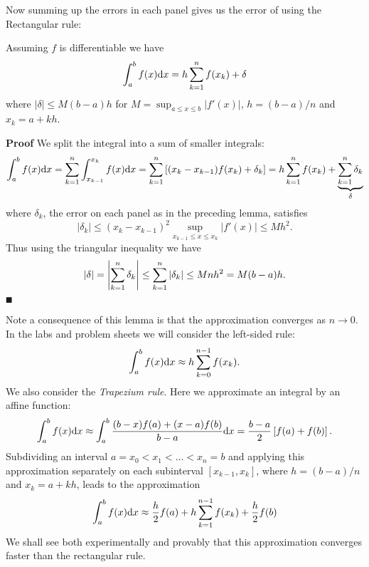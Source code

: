 Now summing up the errors in each panel gives us the error of using the Rectangular rule:

\begin{theorem} Assuming $f$ is differentiable we have
\[
\ensuremath{\int}_a^b f(x) {\rm d}x =  h \ensuremath{\sum}_{k=1}^n f(x_k) +  \ensuremath{\delta}
\]
where $|\ensuremath{\delta}| \ensuremath{\leq} M (b-a) h$ for $M = \sup_{a \ensuremath{\leq} x \ensuremath{\leq} b}|f'(x)|$, $h = (b-a)/n$ and $x_k = a + kh$.

\end{theorem}
\textbf{Proof} We split the integral into a sum of smaller integrals:
\[
\ensuremath{\int}_a^b f(x) {\rm d}x = \ensuremath{\sum}_{k=1}^n  \ensuremath{\int}_{x_{k-1}}^{x_k} f(x) {\rm d}x =
\ensuremath{\sum}_{k=1}^n  \br[(x_k - x_{k-1}) f(x_k) + \ensuremath{\delta}_k] =  h \ensuremath{\sum}_{k=1}^n f(x_k) +  \underbrace{\ensuremath{\sum}_{k=1}^n \ensuremath{\delta}_k}_\ensuremath{\delta}
\]
where $\ensuremath{\delta}_k$, the error on each panel as in the preceding lemma, satisfies
\[
|\ensuremath{\delta}_k| \ensuremath{\leq} (x_k-x_{k-1})^2 \sup_{x_{k-1} \ensuremath{\leq} x \ensuremath{\leq} x_k}|f'(x)| \ensuremath{\leq} M h^2.
\]
Thus using the triangular inequality we have
\[
|\delta| = \left|{ \sum_{k=1}^n \delta_k}\right| \leq \sum_{k=1}^n |\delta_k| \leq M n h^2 = M(b-a)h.
\]
\ensuremath{\QED}

Note a consequence of this lemma is that the approximation converges as $n \ensuremath{\rightarrow} 0$. In the labs and problem sheets we will consider the left-sided rule:
\[
\ensuremath{\int}_a^b f(x) {\rm d}x \ensuremath{\approx}  h \ensuremath{\sum}_{k=0}^{n-1} f(x_k).
\]
We also consider the \emph{Trapezium rule}. Here we approximate an integral  by an affine function:
\[
\ensuremath{\int}_a^b f(x) {\rm d} x \ensuremath{\approx} \ensuremath{\int}_a^b {(b-x)f(a) + (x-a)f(b) \over b-a} \dx
= {b-a \over 2} \br[f(a) + f(b)].
\]
Subdividing an interval $a = x_0 < x_1 < \ensuremath{\ldots} < x_n = b$ and applying this approximation separately on each subinterval $[x_{k-1},x_k]$, where $h = (b-a)/n$ and $x_k = a + kh$, leads to the approximation
\[
\ensuremath{\int}_a^b f(x) {\rm d}x \ensuremath{\approx}  {h \over 2} f(a) + h \ensuremath{\sum}_{k=1}^{n-1} f(x_k) + {h \over 2} f(b)
\]
We shall see both experimentally and provably that this approximation converges faster than the rectangular rule.



